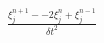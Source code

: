 \documentclass[preview]{standalone}
\begin{document}
\begin{align*}
\frac{\xi_{j}^{n+1} - -2 \xi_{j}^{n} + \xi_{j}^{n-1}}{\delta t^2}
\end{align*}
\end{document}
